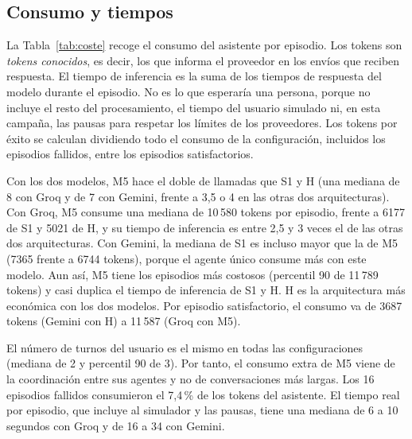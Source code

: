 \subsection{Consumo y tiempos}
\label{sec:resultados-consumo}

La Tabla~\ref{tab:coste} recoge el consumo del asistente por episodio. Los
tokens son \emph{tokens conocidos}, es decir, los que informa el proveedor en
los envíos que reciben respuesta. El tiempo de inferencia es la suma de los
tiempos de respuesta del modelo durante el episodio. No es lo que esperaría una
persona, porque no incluye el resto del procesamiento, el tiempo del usuario
simulado ni, en esta campaña, las pausas para respetar los límites de los
proveedores. Los tokens por éxito se calculan dividiendo todo el consumo de la
configuración, incluidos los episodios fallidos, entre los episodios
satisfactorios.

\begin{table}[!htbp]
\centering
\small
\caption[Consumo del asistente por episodio.]{Consumo del asistente por
episodio: mediana y percentil 90 de llamadas, tokens conocidos y tiempo de
inferencia acumulado, y tokens por episodio satisfactorio.}
\label{tab:coste}

\end{table}

Con los dos modelos, M5 hace el doble de llamadas que S1 y H (una mediana de 8
con Groq y de 7 con Gemini, frente a 3,5 o 4 en las otras dos arquitecturas).
Con Groq, M5 consume una mediana de 10\,580 tokens por episodio, frente a 6177
de S1 y 5021 de H, y su tiempo de inferencia es entre 2,5 y 3 veces el de las
otras dos arquitecturas. Con Gemini, la mediana de S1 es incluso mayor que la de
M5 (7365 frente a 6744 tokens), porque el agente único consume más con este
modelo. Aun así, M5 tiene los episodios más costosos (percentil 90 de 11\,789
tokens) y casi duplica el tiempo de inferencia de S1 y H. H es la arquitectura
más económica con los dos modelos. Por episodio satisfactorio, el consumo va de
3687 tokens (Gemini con H) a 11\,587 (Groq con M5).

El número de turnos del usuario es el mismo en todas las configuraciones
(mediana de 2 y percentil 90 de 3). Por tanto, el consumo extra de M5 viene de
la coordinación entre sus agentes y no de conversaciones más largas. Los 16
episodios fallidos consumieron el 7,4\,\% de los tokens del asistente. El
tiempo real por episodio, que incluye al simulador y las pausas, tiene una
mediana de 6 a 10 segundos con Groq y de 16 a 34 con Gemini.

